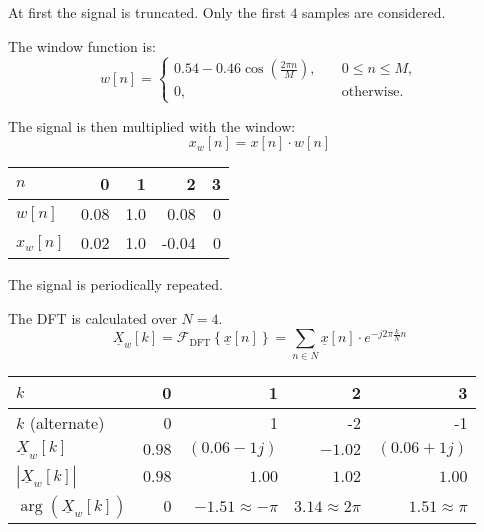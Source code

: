 \begin{solution}
	\begin{tasks}
		\task
		At first the signal is truncated. Only the first $4$ samples are considered.
		
		The window function is:
		\begin{equation*}
			w[n] = \begin{cases}0.54 - 0.46 \cos\left(\frac{2 \pi n}{M}\right), &\quad 0 \leq n \leq M,\\ 0, &\quad \text{otherwise}.\end{cases}
		\end{equation*}
		
		The signal is then multiplied with the window:
		\begin{equation*}
			x_w[n] = x[n] \cdot w[n]
		\end{equation*}
		
		\begin{table}[H]
			\centering
			\begin{tabular}{|l|r|r|r|r|}
				\hline
				$n$ & 0 & 1 & 2 & 3 \\
				\hline
				\hline
				$w[n]$ & 0.08 & 1.0 & 0.08 & 0 \\
				\hline
				$x_w[n]$ & 0.02 & 1.0 & -0.04 & 0 \\
				\hline
			\end{tabular}
		\end{table}
		
		\task
		The signal is periodically repeated.
		
		The DFT is calculated over $N = 4$.
		\begin{equation*}
			\underline{X}_w[k] = \mathcal{F}_{\text{DFT}}\left\{\underline{x}[n]\right\} = \sum\limits_{n \in N} \underline{x}[n] \cdot e^{-j 2\pi \frac{k}{N} n}
		\end{equation*}
		
		\begin{table}[H]
			\centering
			\begin{tabular}{|l|r|r|r|r|}
				\hline
				$k$ & 0 & 1 & 2 & 3 \\
				\hline
				$k$ (alternate) & 0 & 1 & -2 & -1 \\
				\hline
				\hline
				$\underline{X}_w[k]$ & $0.98$ & $(0.06-1j)$ & $-1.02$ & $(0.06+1j)$
 \\
				\hline
				$|\underline{X}_w[k]|$ & $0.98$ & $1.00$ & $1.02$ & $1.00$
 \\
				\hline
				$\arg\left(\underline{X}_w[k]\right)$ & $0$ & $-1.51 \approx -\pi$ & $3.14 \approx 2\pi$ & $1.51 \approx \pi$ \\
				\hline
			\end{tabular}
		\end{table}
	

\end{tasks}
\end{solution}

